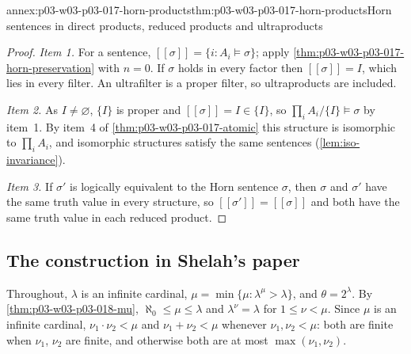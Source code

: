 \begin{annexitem}{annex:p03-w03-p03-017-horn-products}{thm:p03-w03-p03-017-horn-products}{Horn sentences in direct products, reduced products and ultraproducts}
\begin{proof}
\emph{Item 1.}  For a sentence, \([\![\sigma]\!]=\{i:A_i\models\sigma\}\);
apply \cref{thm:p03-w03-p03-017-horn-preservation} with \(n=0\).  If
\(\sigma\) holds in every factor then \([\![\sigma]\!]=I\), which lies in
every filter.  An ultrafilter is a proper filter, so ultraproducts are
included.

\emph{Item 2.}  As \(I\neq\varnothing\), \(\{I\}\) is proper and
\([\![\sigma]\!]=I\in\{I\}\), so \(\prod_iA_i/\{I\}\models\sigma\) by item~1.
By item~4 of \cref{thm:p03-w03-p03-017-atomic} this structure is isomorphic
to \(\prod_iA_i\), and isomorphic structures satisfy the same sentences
(\cref{lem:iso-invariance}).

\emph{Item 3.}  If \(\sigma'\) is logically equivalent to the Horn sentence
\(\sigma\), then \(\sigma\) and \(\sigma'\) have the same truth value in every
structure, so \([\![\sigma']\!]=[\![\sigma]\!]\) and both have the same truth
value in each reduced product.
\end{proof}
\end{annexitem}

\subsection{The construction in Shelah's paper}

Throughout, \(\lambda\) is an infinite cardinal,
\(\mu=\min\{\mu:\lambda^\mu>\lambda\}\), and \(\theta=2^\lambda\).  By
\cref{thm:p03-w03-p03-018-mu}, \(\aleph_0\le\mu\le\lambda\) and
\(\lambda^\nu=\lambda\) for \(1\le\nu<\mu\).  Since \(\mu\) is an infinite
cardinal, \(\nu_1\cdot\nu_2<\mu\) and \(\nu_1+\nu_2<\mu\) whenever
\(\nu_1,\nu_2<\mu\): both are finite when \(\nu_1\), \(\nu_2\) are finite,
and otherwise both are at most \(\max(\nu_1,\nu_2)\).

